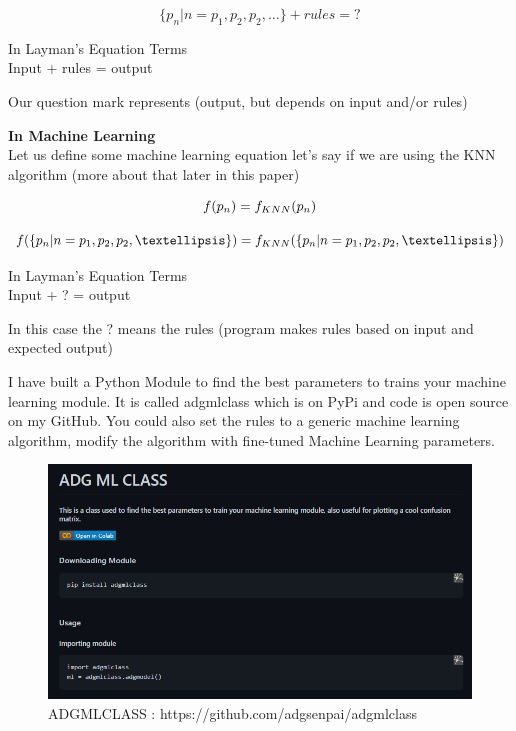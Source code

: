 \begin{equation}
    \{p_n | n=p_1,p_2,p_2,…\}  +rules= ? 
\end{equation}

\begin{center}
    In Layman’s Equation Terms \\ 
    Input + rules = output \\ 
\end{center}

\begin{center}
    Our question mark represents (output, but depends on input and/or rules)
\end{center}

\textbf{In Machine Learning} \\ 

Let us define some machine learning equation let’s say if we are using the KNN algorithm (more about that later in this paper)

\begin{equation}
f(p_n )= f_{KNN} (p_n) \\
\end{equation}

\begin{equation}
f(\{p_n | n=p_1,p_2,p_2,…\})= f_{KNN} (\{p_n | n=p_1,p_2,p_2,…\}) \\ 
\end{equation}

\begin{center}
In Layman’s Equation Terms \\ 
Input + ? = output \\
\end{center}


\begin{center}
In this case the ? means the rules (program makes rules based on input and
expected output)
\end{center}
 
I have built a Python Module to find the best parameters to trains your machine learning module.
It is called adgmlclass which is on PyPi and code is open source on my GitHub.
You could also set the rules to a generic machine learning algorithm, modify the algorithm with fine-tuned Machine Learning parameters. 

\begin{figure}[H]
    \includegraphics[width=\linewidth]{images/adgmlclassrepo.png}
    \caption{ADGMLCLASS : https://github.com/adgsenpai/adgmlclass}
    \label{fig:adgmlclass}
\end{figure}

